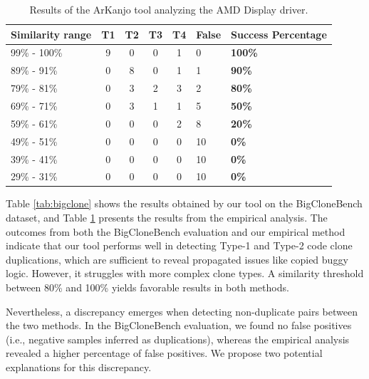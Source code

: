 \documentclass[conference]{IEEEtran}
\begin{document}
\begin{table}[ht]

\centering
\caption{Results of the ArKanjo tool analyzing the AMD Display driver.}
\begin{tabular}{ | m{15mm} | c | c | c | c | m{6mm} | m{10mm} | }

\hline

\textbf{Similarity range} & \textbf{T1} & \textbf{T2} & T3 & T4
& \textbf{False} & \textbf{Success Percentage} \\ \hline
99\% - 100\% & 9 & 0 & 0 & 1 & 0 & \textbf{100\%} \\ \hline
89\% - 91\% & 0 & 8 & 0 & 1 & 1 & \textbf{90\%} \\ \hline
79\% - 81\% & 0 & 3 & 2 & 3 & 2 & \textbf{80\%} \\ \hline
69\% - 71\% & 0 & 3 & 1 & 1 & 5 & \textbf{50\%} \\ \hline
59\% - 61\% & 0 & 0 & 0 & 2 & 8 & \textbf{20\%} \\ \hline
49\% - 51\% & 0 & 0 & 0 & 0 & 10 & \textbf{0\%} \\ \hline
39\% - 41\% & 0 & 0 & 0 & 0 & 10 & \textbf{0\%} \\ \hline
29\% - 31\% & 0 & 0 & 0 & 0 & 10 & \textbf{0\%} \\ \hline

\hline

\end{tabular}

\label{tab:emp}

\end{table}

Table \ref{tab:bigclone} shows the results obtained by our tool on the BigCloneBench dataset,
and Table \ref{tab:emp} presents the results from the empirical analysis.
The outcomes from both the BigCloneBench evaluation and our empirical method indicate that
our tool performs well in detecting Type-1 and Type-2 code clone duplications,
which are sufficient to reveal propagated issues like copied buggy logic.
However, it struggles with more complex clone types. A similarity threshold between 80\% and 100\% 
yields favorable results in both methods.

Nevertheless, a discrepancy emerges when detecting non-duplicate pairs between
the two methods. In the BigCloneBench evaluation, we found no false positives (i.e., negative
samples inferred as duplications), whereas the empirical analysis revealed a higher percentage
of false positives. We propose two potential explanations for this discrepancy.
\end{document}
